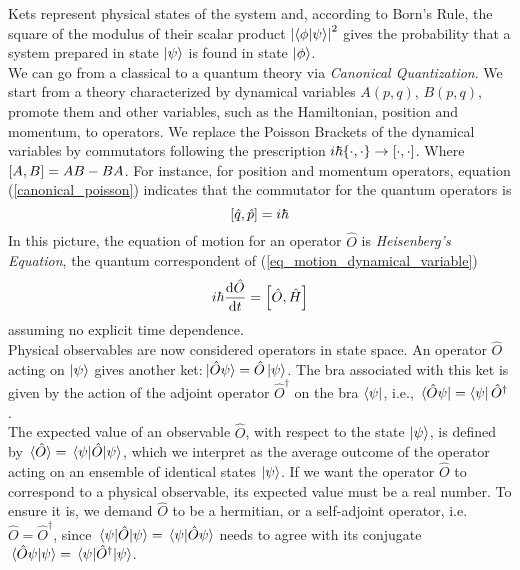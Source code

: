 Kets represent physical states of the system and, according to Born's Rule, the square of the modulus of their scalar product $\abs{\braket{\phi}{\psi}}
^2$ gives the probability that a system prepared in state $\ket{\psi}$ is found in state $\ket{\phi}$.\\

We can go from a classical to a quantum theory via \textit{Canonical Quantization}. We start from a theory characterized by dynamical variables $A(p,q)$, $B(p,q)$, promote them and other variables, such as the Hamiltonian, position and momentum, to operators. We replace the Poisson Brackets of the dynamical variables by commutators following the prescription $i\hbar\pb{\cdot}{\cdot}\to\comm{\cdot}{\cdot}$. Where $\comm{A}{B}=AB-BA$. For instance, for position and momentum operators, equation (\ref{canonical_poisson}) indicates that the commutator for the quantum operators is
\begin{equation}
    \comm{\hat{q}}{\hat{p}}=i\hbar
    \label{canonica_comm}
\end{equation}
In this picture, the equation of motion for an operator $\hat{O}$ is \textit{Heisenberg's Equation}, the quantum correspondent of (\ref{eq_motion_dynamical_variable})
\begin{equation}
    i\hbar\dv{\hat{O}}{t}=\comm{\hat{O}}{\hat{H}}
    \label{heisenberg_eq}
\end{equation}
assuming no explicit time dependence. \\

Physical observables are now considered operators in state space. An operator $\hat{O}$ acting on $\ket{\psi}$ gives another ket:$\ket*{\hat{O}\psi}=\hat{O}\ket{\psi}$. The bra associated with this ket is given by the action of the adjoint operator $\hat{O}^\dagger$ on the bra $\bra{\psi}$, i.e., $\bra*{\hat{O}\psi}=\bra{\psi}\hat{O}^\dagger$.\\

The expected value of an observable $\hat{O}$, with respect to the state $\ket{\psi}$, is defined by $\ev*{\hat{O}}=\ev*{\hat{O}}{\psi}$, which we interpret as the average outcome of the operator acting on an ensemble of identical states $\ket{\psi}$. If we want the operator $\hat{O}$ to correspond to a physical observable, its expected value must be a real number. To ensure it is, we demand $\hat{O}$ to be a hermitian, or a self-adjoint operator, i.e. $\hat{O}=\hat{O}^\dagger$, since $\ev*{\hat{O}}{\psi}=\braket*{\psi}{\hat{O}\psi}$ needs to agree with  its  conjugate $\braket*{\hat{O}
\psi}{\psi}=\ev*{\hat{O}^\dagger}{\psi}$. \\

